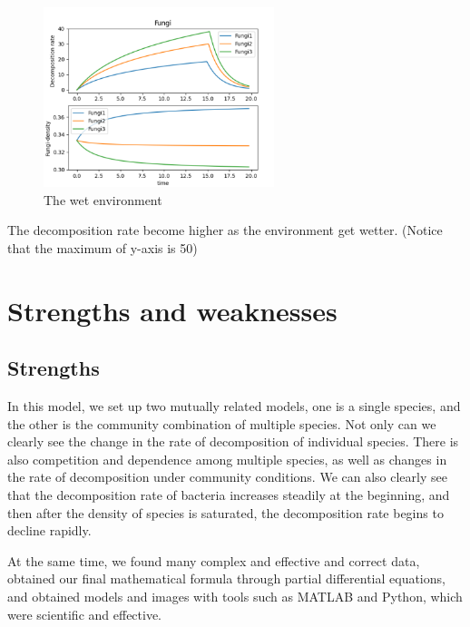 \documentclass{mcmthesis}
\begin{document}
\begin{figure}[H]
  \centering
  \includegraphics[width=0.6\textwidth]{figures/Model 2.png}
  \caption{The wet environment}
\end{figure}
The decomposition rate become higher as the environment get wetter.
(Notice that the maximum of y-axis is 50)

\section{Strengths and weaknesses}

\subsection{Strengths}
In this model, we set up two mutually related models, one is a single species, and the other is the community combination of multiple species.
Not only can we clearly see the change in the rate of decomposition of individual species.
There is also competition and dependence among multiple species, as well as changes in the rate of decomposition under community conditions.
We can also clearly see that the decomposition rate of bacteria increases steadily at the beginning, and then after the density of species is saturated, the decomposition rate begins to decline rapidly.

At the same time, we found many complex and effective and correct data, obtained our final mathematical formula through partial differential equations, and obtained models and images with tools such as MATLAB and Python, which were scientific and effective.
\end{document}

